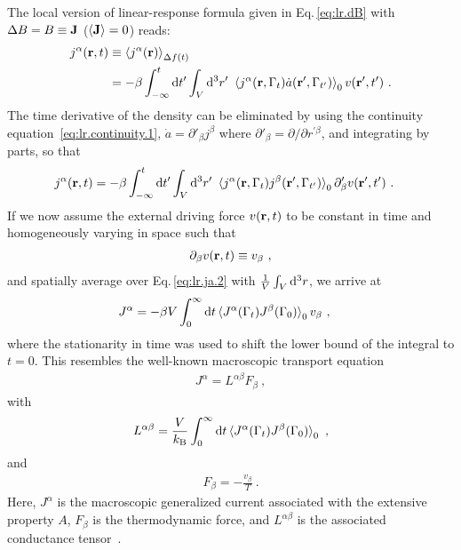 The local version of linear-response formula given in Eq.\,\eqref{eq:lr.dB} with \mbox{$\Delta B = B \equiv {\bf J}$} ($\braket{{\bf J}} = 0$) reads:
\begin{align}
j^\alpha (\b r , t) 
	& \equiv \braket{j^\alpha (\b r)}_{\Delta f (t)} \\
	&= - \beta \int_{-\infty}^{t} \d t' \int_V \d^3 r' ~ \braket{
			j^\alpha (\b r, \Gamma_t) \dot{a} (\b r', \Gamma_{t'})
		}_0 v (\b r', t')~.
	\label{eq:lr.ja.1}
\end{align}
The time derivative of the density can be eliminated by using the continuity equation~\eqref{eq:lr.continuity.1}, $\dot a = \partial'_\beta j^\beta$ where $\partial'_\beta = \partial/\partial r^{\prime \beta}$, and integrating by parts, so that
\begin{align}
j^\alpha (\b r , t) 
&= - \beta \int_{-\infty}^{t} \d t' \int_V \d^3 r' ~ \braket{
	j^\alpha (\b r, \Gamma_t) j^\beta (\b r', \Gamma_{t'})
}_0 \partial'_\beta v (\b r', t')~.
\label{eq:lr.ja.2}
\end{align}
If we now assume the external driving force $v ({\bf r}, t)$ to be constant in time and homogeneously varying in space such that
\begin{align}
	\partial_\beta v (\b r, t) \equiv v_\beta~,
	\label{eq:lr.force}
\end{align}
and spatially average over Eq.\,\eqref{eq:lr.ja.2} with $\frac{1}{V} \int_V {\rm d}^3 r$, we arrive at
\begin{align}
	J^\alpha 
		&= -\beta V \int_{0}^{\infty} 
		\d t
		\braket{
		J^\alpha (\Gamma_t) J^\beta (\Gamma_{0})
	}_0 
	v_\beta~,
	\label{eq:lr.J}
\end{align}
where the stationarity in time was used to shift the lower bound of the integral to $t=0$.
This resembles the well-known macroscopic transport equation
\begin{align}
	J^\alpha =  L^{\alpha \beta} F_\beta~,
		\label{eq:lr.LF}
\end{align}
with
\begin{align}
	L^{\alpha \beta}
		= \frac{V}{k_{\rm B}} \int_{0}^{\infty} 
		\d t \braket{J^\alpha (\Gamma_t) J^\beta (\Gamma_{0})}_0 ~,
	\label{eq:lr.L}
\end{align}
and
\begin{align}
	F_\beta
		= - \frac{v_\beta}{T}~.
	\label{eq:lr.F}
\end{align}
Here, $J^\alpha$ is the macroscopic generalized current associated with the extensive property $A$, $F_\beta$ is the thermodynamic force, and $L^{\alpha \beta}$ is the associated conductance tensor~\cite{Onsager1931a,Baroni2020a}.


